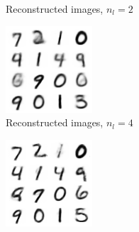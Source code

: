 \documentclass{article}
\begin{document}
\begin{figure}
\begin{subfigure}[b]{.2\textwidth}
    \caption{Reconstructed images, $n_l = 2$}
    \label{subfig:recons n_l=2}
  \end{subfigure}
  \hfill
  \begin{subfigure}[b]{.2\textwidth}
    \centering
    \includegraphics[width=\textwidth]{report/images/lat4/vae_0.5_0.5_ep100_lat4_hid512_2201-1012.pt_reconstructed.png}
    \caption{Reconstructed images, $n_l = 4$}
    \label{subfig:recons n_l=4}
  \end{subfigure}
  \hfill
  \begin{subfigure}[b]{.2\textwidth}
    \centering
    \includegraphics[width=\textwidth]{report/images/lat8/vae_0.5_0.5_ep100_lat8_hid512_2201-1114.pt_reconstructed.png}

\end{subfigure}
\end{figure}
\end{document}
